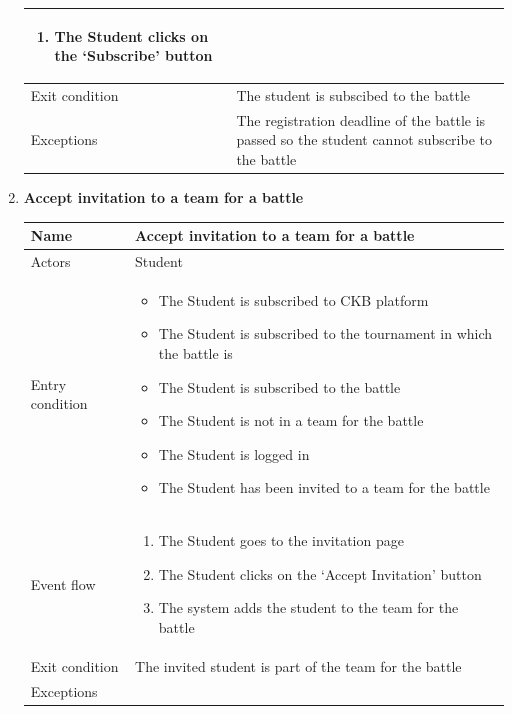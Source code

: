 \begin{enumerate}[label=UC\arabic*:]
\begin{tabular}{|p{3cm}|p{8cm}|}
\begin{enumerate}[label=\arabic*.]
            \item The Student clicks on the `Subscribe' button
        \end{enumerate} \\
        \hline
        Exit condition & The student is subscibed to the battle \\
        \hline
        Exceptions & The registration deadline of the battle is passed so the student cannot subscribe to the battle \\
        \hline
    \end{tabular}
    \item \textbf{Accept invitation to a team for a battle} \\
    \begin{tabular}{|p{3cm}|p{8cm}|}
        \hline
        Name & Accept invitation to a team for a battle \\
        \hline
        Actors & Student \\
        \hline
        Entry condition &
        \begin{itemize}
            \item The Student is subscribed to CKB platform
            \item The Student is subscribed to the tournament in which the battle is
            \item The Student is subscribed to the battle
            \item The Student is not in a team for the battle
            \item The Student is logged in
            \item The Student has been invited to a team for the battle
        \end{itemize} \\
        \hline
        Event flow &
        \begin{enumerate}[label=\arabic*.]
            \item The Student goes to the invitation page
            \item The Student clicks on the `Accept Invitation' button
            \item The system adds the student to the team for the battle
        \end{enumerate} \\
        \hline
        Exit condition & The invited student is part of the team for the battle \\
        \hline
        Exceptions &
        \begin{itemize}

\end{itemize}
\end{tabular}
\end{enumerate}
